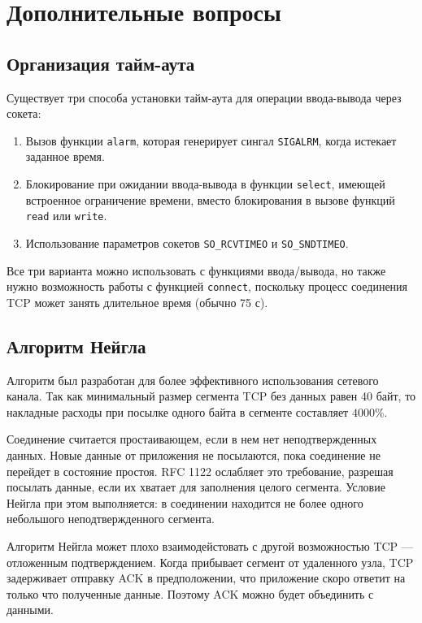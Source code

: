 \section{Дополнительные вопросы}
\label{sec:network-addition}

\subsection{Организация тайм-аута}
Существует три способа установки тайм-аута для операции ввода-вывода через сокета:
\begin{enumerate}
  \item Вызов функции \lstinline{alarm}, которая генерирует сингал \lstinline{SIGALRM}, когда истекает заданное время.
  \item Блокирование при ожидании ввода-вывода в функции \lstinline{select}, имеющей встроенное ограничение времени, вместо блокирования в вызове функций \lstinline{read} или \lstinline{write}.
  \item Использование параметров сокетов \lstinline{SO_RCVTIMEO} и \lstinline{SO_SNDTIMEO}.
\end{enumerate}

Все три варианта можно использовать с функциями ввода/вывода, но также нужно возможность работы с функцией \lstinline{connect}, поскольку процесс соединения TCP может занять длительное время (обычно 75 с).

\subsection{Алгоритм Нейгла}
\label{sec:nagle-algorithm}
Алгоритм был разработан для более эффективного использования сетевого канала. Так как минимальный размер сегмента TCP без данных равен 40 байт, то накладные расходы при посылке одного байта в сегменте составляет $4000\%$.

Соединение считается простаивающем, если в нем нет неподтвержденных данных. Новые данные от приложения не посылаются, пока соединение не перейдет в состояние простоя. RFC 1122 ослабляет это требование, разрешая посылать данные, если их хватает для заполнения целого сегмента. Условие Нейгла при этом выполняется: в соединении находится не более одного небольшого неподтвержденного сегмента.

Алгоритм Нейгла может плохо взаимодейстовать с другой возможностью TCP --- отложенным подтверждением. Когда прибывает сегмент от удаленного узла, TCP задерживает отправку ACK в предположении, что приложение скоро ответит на только что полученные данные. Поэтому ACK можно будет объединить с данными.

